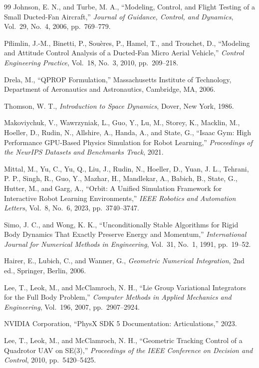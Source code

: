 \documentclass[10pt,letterpaper]{article}
\begin{document}
\begin{thebibliography}{99}
Johnson, E. N., and Turbe, M. A., ``Modeling, Control, and Flight Testing of a Small Ducted-Fan Aircraft,'' \textit{Journal of Guidance, Control, and Dynamics}, Vol.~29, No.~4, 2006, pp.~769--779.

Pflimlin, J.-M., Binetti, P., Sou\`eres, P., Hamel, T., and Trouchet, D., ``Modeling and Attitude Control Analysis of a Ducted-Fan Micro Aerial Vehicle,'' \textit{Control Engineering Practice}, Vol.~18, No.~3, 2010, pp.~209--218.

Drela, M., ``QPROP Formulation,'' Massachusetts Institute of Technology, Department of Aeronautics and Astronautics, Cambridge, MA, 2006.

Thomson, W. T., \textit{Introduction to Space Dynamics}, Dover, New York, 1986.

Makoviychuk, V., Wawrzyniak, L., Guo, Y., Lu, M., Storey, K., Macklin, M., Hoeller, D., Rudin, N., Allshire, A., Handa, A., and State, G., ``Isaac Gym: High Performance GPU-Based Physics Simulation for Robot Learning,'' \textit{Proceedings of the NeurIPS Datasets and Benchmarks Track}, 2021.

Mittal, M., Yu, C., Yu, Q., Liu, J., Rudin, N., Hoeller, D., Yuan, J. L., Tehrani, P. P., Singh, R., Guo, Y., Mazhar, H., Mandlekar, A., Babich, B., State, G., Hutter, M., and Garg, A., ``Orbit: A Unified Simulation Framework for Interactive Robot Learning Environments,'' \textit{IEEE Robotics and Automation Letters}, Vol.~8, No.~6, 2023, pp.~3740--3747.

Simo, J. C., and Wong, K. K., ``Unconditionally Stable Algorithms for Rigid Body Dynamics That Exactly Preserve Energy and Momentum,'' \textit{International Journal for Numerical Methods in Engineering}, Vol.~31, No.~1, 1991, pp.~19--52.

Hairer, E., Lubich, C., and Wanner, G., \textit{Geometric Numerical Integration}, 2nd ed., Springer, Berlin, 2006.

Lee, T., Leok, M., and McClamroch, N. H., ``Lie Group Variational Integrators for the Full Body Problem,'' \textit{Computer Methods in Applied Mechanics and Engineering}, Vol.~196, 2007, pp.~2907--2924.

NVIDIA Corporation, ``PhysX SDK 5 Documentation: Articulations,'' 2023.

Lee, T., Leok, M., and McClamroch, N. H., ``Geometric Tracking Control of a Quadrotor UAV on SE(3),'' \textit{Proceedings of the IEEE Conference on Decision and Control}, 2010, pp.~5420--5425.


\end{thebibliography}
\end{document}
